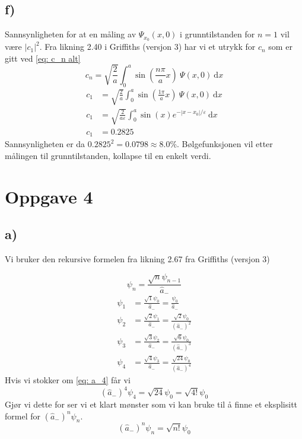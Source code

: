 \documentclass[norsk]{article}
\begin{document}
\subsection*{f)}
Sannsynligheten for at en måling av $Ψ_{x_0}(x,0)$ i grunntilstanden for $n=1$ vil være $\left|c_1\right| ^2$. Fra likning 2.40 i Griffiths (versjon 3) har vi et utrykk for $c_n$ som er gitt ved \cref{eq: c_n alt} 
\begin{equation}\label{eq: c_n alt}
c_n = \sqrt{\frac{2}{a}} ∫_{0}^{a} \sin \left(\frac{nπ}{a}x\right)\ Ψ(x,0) \ \mathrm{d}x
\end{equation}
\begin{align}
c_1 &= \sqrt{\frac{2}{a}} ∫_{0}^{a} \sin \left(\frac{1π}{a}x\right)\ Ψ(x,0) \ \mathrm{d}x \\
c_1 &= \sqrt{\frac{2}{aε}} ∫_{0}^{a} \sin \left(x\right)e^{- \left|x - x_0\right| / ε} \ \mathrm{d}x \\
c_1 &= 0.2825 
\end{align}
Sannsynligheten er da $0.2825^2 = 0.0798 ≈ 8.0 \%$. 
Bølgefunksjonen vil etter målingen til grunntilstanden, kollapse til en enkelt verdi. 


\section*{Oppgave 4}
\subsection*{a)}
Vi bruker den rekursive formelen fra likning 2.67 fra Griffiths (versjon 3)

\begin{equation}\label{eq: a rek}
ψ_n = \frac{\sqrt{n}ψ_{n-1}}{\hat{a}_{-}}
\end{equation}
\begin{align}
  ψ_1 &= \frac{\sqrt{1}ψ_{0}}{\hat{a}_{-}} = \frac{ψ_{0}}{\hat{a}_{-}} \label{eq: a_1} \\ 
  ψ_2 &= \frac{\sqrt{2}ψ_{1}}{\hat{a}_{-}} = \frac{\sqrt{2}ψ_0}{\left(\hat{a}_{-}\right)^2} \label{eq: a_2} \\
  ψ_3 &= \frac{\sqrt{3}ψ_{2}}{\hat{a}_{-}} = \frac{\sqrt{6}ψ_0}{\left(\hat{a}_{-}\right)^3} \label{eq: a_3} \\
  ψ_4 &= \frac{\sqrt{4}ψ_{3}}{\hat{a}_{-}} = \frac{\sqrt{24}ψ_0}{\left(\hat{a}_{-}\right)^4} \label{eq: a_4}
\end{align}
Hvis vi stokker om \cref{eq: a_4} får vi 
\[
\left(\hat{a}_{-}\right)^4 ψ_4 = \sqrt{24} ψ_0 = \sqrt{4!}ψ_0
\]
Gjør vi dette for  ser vi et klart mønster som vi kan bruke til å finne et eksplisitt formel for $\left(\hat{a}_{-}\right)^{n}ψ_n$.
\begin{equation}\label{eq: psi_n}
\left(\hat{a}_{-}\right)^{n} ψ_n = \sqrt{n!} ψ_0
\end{equation}
\end{document}
